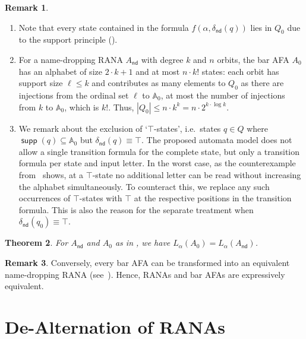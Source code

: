 \documentclass[10pt,a4paper]{amsart}
\newtheorem{theo}{Theorem}[section]
\theoremstyle{definition}
\newtheorem{rem}[theo]{Remark}
\newcommand{\seq}{\subseteq}
\newcommand{\At}{\mathds{A}}
\newcommand{\op}[1]{\operatorname{\mathsf{#1}}}
\newcommand{\nd}{\op{nd}}
\DeclareMathOperator{\supp}{\mathsf{supp}}
\newcommand{\names}{\At}
\renewcommand{\enquote}[1]{`#1'}
\begin{document}
\begin{rem}\label{R:barafa}
  \begin{enumerate}%
  \item Note that every state contained in the formula $f(\alpha, \delta_{\nd}(q))$ lies in $Q_0$ due to the support principle (). 
  \item\label{R:barafa:2} For a name-dropping RANA $A_{\nd}$ with degree $k$ and $n$ orbits, the bar AFA $A_0$ has an alphabet of size $2\cdot k + 1$ and at most $n \cdot k!$ states: each orbit has support size $\ell \leqslant k$ and contributes as many elements to $Q_0$ as there are injections
      from the ordinal set $\ell$ to $\names_0$, at most the number of injections from $k$ to $\names_0$, which is $k!$. Thus, $|Q_0| \leqslant n \cdot k^k = n \cdot 2^{k \cdot \log k}$.  
    \item We remark about the exclusion of \enquote{$\top$-states}, i.e.~states $q \in Q$ where
      $\supp(q) \seq \names_0$ but $\delta_{\nd}(q) \equiv \top$. The proposed automata model does not allow
      a single transition formula for the complete state, but only a transition formula per state and
      input letter. In the worst case, as the counterexample from~ shows,
      at a $\top$-state no additional letter can be read without increasing the alphabet simultaneously.
      To counteract this, we replace any such occurrences of $\top$-states with $\top$
      at the respective positions in the transition formula. This is also the reason for the separate
      treatment when $\delta_{\nd}(q_0) \equiv \top$.
  \end{enumerate}
\end{rem}

\begin{theo} \label{thm:bafaEquiv}
For $A_{\nd}$ and $A_0$ as in , we have $L_\alpha(A_0) = L_\alpha(A_{\nd})$.
\end{theo}

\begin{rem}\label{rem:bafa2rana}
Conversely, every bar AFA can be transformed into an equivalent name-dropping RANA (see~). %
Hence, RANAs and bar AFAs are expressively equivalent.
\end{rem}


\section{De-Alternation of RANAs}\label{sec:dealt}
\end{document}
